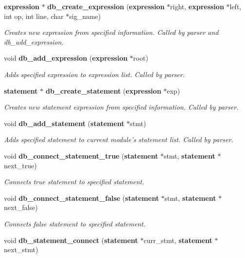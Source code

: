 \begin{CompactItemize}
{\bf expression} $\ast$ {\bf db\_\-create\_\-expression} ({\bf expression} $\ast$right, {\bf expression} $\ast$left, int op, int line, char $\ast$sig\_\-name)
\begin{CompactList}\small\item\em Creates new expression from specified information. Called by parser and db\_\-add\_\-expression.\item\end{CompactList}\item 
void {\bf db\_\-add\_\-expression} ({\bf expression} $\ast$root)
\begin{CompactList}\small\item\em Adds specified expression to expression list. Called by parser.\item\end{CompactList}\item 
{\bf statement} $\ast$ {\bf db\_\-create\_\-statement} ({\bf expression} $\ast$exp)
\begin{CompactList}\small\item\em Creates new statement expression from specified information. Called by parser.\item\end{CompactList}\item 
void {\bf db\_\-add\_\-statement} ({\bf statement} $\ast$stmt)
\begin{CompactList}\small\item\em Adds specified statement to current module's statement list. Called by parser.\item\end{CompactList}\item 
void {\bf db\_\-connect\_\-statement\_\-true} ({\bf statement} $\ast$stmt, {\bf statement} $\ast$next\_\-true)
\begin{CompactList}\small\item\em Connects true statement to specified statement.\item\end{CompactList}\item 
void {\bf db\_\-connect\_\-statement\_\-false} ({\bf statement} $\ast$stmt, {\bf statement} $\ast$next\_\-false)
\begin{CompactList}\small\item\em Connects false statement to specified statement.\item\end{CompactList}\item 
void {\bf db\_\-statement\_\-connect} ({\bf statement} $\ast$curr\_\-stmt, {\bf statement} $\ast$next\_\-stmt)

\end{CompactItemize}
